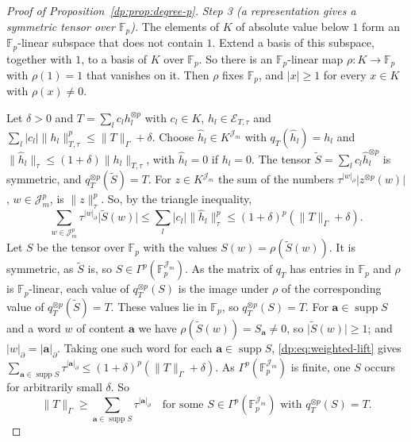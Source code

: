 \documentclass[11pt]{amsart}
\theoremstyle{definition}
\theoremstyle{remark}
\numberwithin{equation}{section}
\newcommand{\F}{\mathbb F}
\newcommand{\abs}[1]{\lvert #1\rvert}
\newcommand{\norm}[1]{\lVert #1\rVert}
\theoremstyle{plain}
\theoremstyle{definition}
\theoremstyle{plain}
\begin{document}
\begin{proof}[Proof of Proposition~\ref{dp:prop:degree-p}]
\emph{Step 3 (a representation gives a symmetric tensor over $\F_p$).} The elements of $K$ of absolute value below $1$ form an $\F_p$\nobreakdash-linear subspace that does not contain $1$. Extend a basis of this subspace, together with $1$, to a basis of $K$ over $\F_p$. So there is an $\F_p$\nobreakdash-linear map $\rho\colon K\to\F_p$ with $\rho(1)=1$ that vanishes on it. Then $\rho$ fixes $\F_p$, and $\abs x\ge1$ for every $x\in K$ with $\rho(x)\ne0$.

Let $\delta>0$ and $T=\sum_lc_lh_l^{\otimes p}$ with $c_l\in K$, $h_l\in\mathcal E_{T,\tau}$ and $\sum_l\abs{c_l}\norm{h_l}_{T,\tau}^p\le\norm T_\Gamma+\delta$. Choose $\hat h_l\in K^{\mathcal J_m}$ with $q_T(\hat h_l)=h_l$ and $\norm{\hat h_l}_\tau\le(1+\delta)\norm{h_l}_{T,\tau}$, with $\hat h_l=0$ if $h_l=0$. The tensor $\widetilde S=\sum_lc_l\hat h_l^{\otimes p}$ is symmetric, and $q_T^{\otimes p}(\widetilde S)=T$. For $z\in K^{\mathcal J_m}$ the sum of the numbers $\tau^{\abs w_\partial}\abs{z^{\otimes p}(w)}$, $w\in\mathcal J_m^p$, is $\norm z_\tau^p$. So, by the triangle inequality,
\begin{equation}\label{dp:eq:weighted-lift}
 \sum_{w\in\mathcal J_m^p}\tau^{\abs w_\partial}\abs{\widetilde S(w)}\le\sum_l\abs{c_l}\norm{\hat h_l}_\tau^p\le(1+\delta)^p(\norm T_\Gamma+\delta).
\end{equation}
Let $S$ be the tensor over $\F_p$ with the values $S(w)=\rho(\widetilde S(w))$. It is symmetric, as $\widetilde S$ is, so $S\in\Gamma^p(\F_p^{\mathcal J_m})$. As the matrix of $q_T$ has entries in $\F_p$ and $\rho$ is $\F_p$\nobreakdash-linear, each value of $q_T^{\otimes p}(S)$ is the image under $\rho$ of the corresponding value of $q_T^{\otimes p}(\widetilde S)=T$. These values lie in $\F_p$, so $q_T^{\otimes p}(S)=T$. For $\mathbf a\in\operatorname{supp}S$ and a word $w$ of content $\mathbf a$ we have $\rho(\widetilde S(w))=S_{\mathbf a}\ne0$, so $\abs{\widetilde S(w)}\ge1$; and $\abs w_\partial=\abs{\mathbf a}_\partial$. Taking one such word for each $\mathbf a\in\operatorname{supp}S$, \eqref{dp:eq:weighted-lift} gives $\sum_{\mathbf a\in\operatorname{supp}S}\tau^{\abs{\mathbf a}_\partial}\le(1+\delta)^p(\norm T_\Gamma+\delta)$. As $\Gamma^p(\F_p^{\mathcal J_m})$ is finite, one $S$ occurs for arbitrarily small $\delta$. So
\begin{equation}\label{dp:eq:support-bound}
 \norm T_\Gamma\ge\sum_{\mathbf a\in\operatorname{supp}S}\tau^{\abs{\mathbf a}_\partial}\quad\text{for some }S\in\Gamma^p(\F_p^{\mathcal J_m})\text{ with }q_T^{\otimes p}(S)=T.
\end{equation}


\end{proof}
\end{document}
